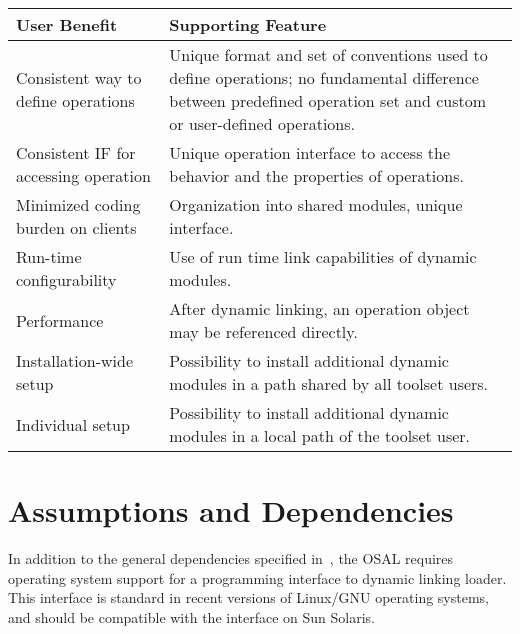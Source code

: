 \documentclass[twoside]{tce}
\begin{document}
\begin{center}
\begin{longtable}{p{}p{}}
  User Benefit                 &       Supporting Feature \\
\hline
 Consistent way to define operations   & Unique format and set of
                                         conventions used to define
                                         operations; no fundamental
                                         difference between predefined
                                         operation set and custom or
                                         user-defined operations. \\
 Consistent IF for accessing operation & Unique operation interface to
                                         access the behavior and the
                                         properties of operations. \\
 Minimized coding burden on clients    & Organization into shared
                                         modules, unique interface.\\
 Run-time configurability              & Use of run time link capabilities
                                         of dynamic modules. \\
 Performance                           & After dynamic linking, an operation
                                         object may be referenced
                                         directly. \\
 Installation-wide setup               & Possibility to install additional
                                         dynamic modules in a path shared by
                                         all toolset users.\\
 Individual setup                      & Possibility to install additional
                                         dynamic modules in a local path of
                                         the toolset user.\\
\end{longtable}
\end{center}

\section{Assumptions and Dependencies}

In addition to the general dependencies specified in~\cite{ProjectPlan}, the
OSAL requires operating system support for a programming interface to
dynamic linking loader.  This interface is standard in recent versions of
Linux/GNU operating systems, and should be compatible with the interface on
Sun Solaris.
\end{document}
